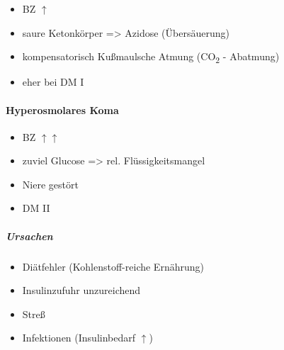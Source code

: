 \begin{itemize}
\item BZ ${\uparrow}$

\item saure Ketonkörper ={\textgreater} Azidose (\"Ubersäuerung)

\item kompensatorisch Ku{\ss}maul{\textquotesingle}sche Atmung
(CO\textsubscript{2} - Abatmung)


\item eher bei DM I

\end{itemize}

\paragraph{Hyperosmolares Koma}

\begin{itemize}
    \item BZ ${\uparrow}$${\uparrow}$
    
    \item zuviel Glucose ={\textgreater} rel. Fl\"ussigkeitsmangel
    
    \item Niere gestört
    
    \item DM II
    
\end{itemize}

\subparagraph*{Ursachen}

\begin{itemize}
\item Diätfehler (Kohlenstoff-reiche Ernährung)

\item Insulinzufuhr unzureichend

\item Stre{\ss}

\item Infektionen (Insulinbedarf ${\uparrow}$)

\end{itemize}

